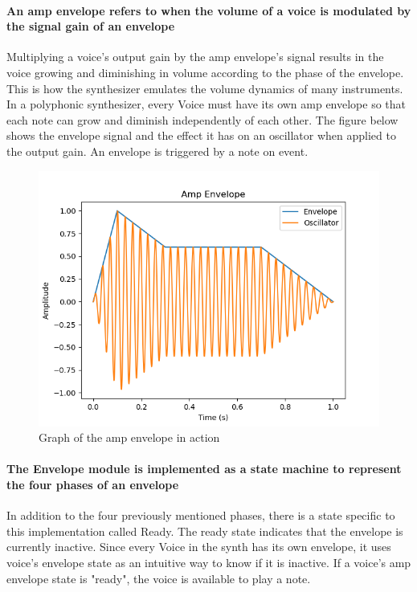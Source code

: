 \documentclass[acmlarge,screen]{acmart}
\begin{document}
	\paragraph{An amp envelope refers to when the volume of a voice is modulated by the signal gain of an envelope} Multiplying a voice's output gain by the amp envelope's signal results in the voice growing and diminishing in volume according to the phase of the envelope. This is how the synthesizer emulates the volume dynamics of many instruments. In a polyphonic synthesizer, every Voice must have its own amp envelope so that each note can grow and diminish independently of each other. The figure below shows the envelope signal and the effect it has on an oscillator when applied to the output gain. An envelope is triggered by a note on event. 
	
	\begin{figure}
		\centering
		\includegraphics[width=.8\linewidth]{amp_envelope_visual}
		\caption{Graph of the amp envelope in action}
	\end{figure}
	
	\paragraph{The Envelope module is implemented as a state machine to represent the four phases of an envelope} In addition to the four previously mentioned phases, there is a state specific to this implementation called Ready. The ready state indicates that the envelope is currently inactive. Since every Voice in the synth has its own envelope, it uses voice's envelope state as an intuitive way to know if it is inactive. If a voice's amp envelope state is "ready", the voice is available to play a note. 
	
\end{document}
